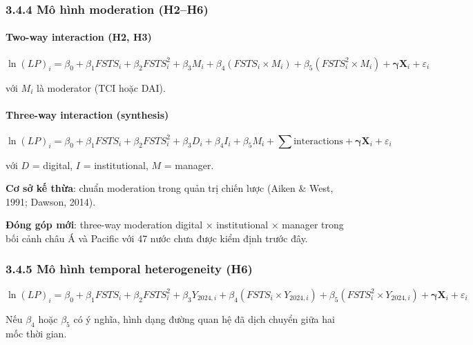 \documentclass[12pt,a4paper]{article}
\begin{document}
\hypertarget{344-muxf4-huxecnh-moderation-h2h6}{%
\subsubsection{3.4.4 Mô hình moderation
(H2--H6)}\label{344-muxf4-huxecnh-moderation-h2h6}}

\hypertarget{two-way-interaction-h2-h3}{%
\paragraph{Two-way interaction (H2,
H3)}\label{two-way-interaction-h2-h3}}

\[\ln(LP)_i = \beta_0 + \beta_1 FSTS_i + \beta_2 FSTS_i^2 + \beta_3 M_i + \beta_4 (FSTS_i \times M_i) + \beta_5 (FSTS_i^2 \times M_i) + \boldsymbol{\gamma} \mathbf{X}_i + \varepsilon_i\]

với \(M_i\) là moderator (TCI hoặc DAI).

\hypertarget{three-way-interaction-synthesis}{%
\paragraph{Three-way interaction
(synthesis)}\label{three-way-interaction-synthesis}}

\[\ln(LP)_i = \beta_0 + \beta_1 FSTS_i + \beta_2 FSTS_i^2 + \beta_3 D_i + \beta_4 I_i + \beta_5 M_i + \sum \text{interactions} + \boldsymbol{\gamma} \mathbf{X}_i + \varepsilon_i\]

với \(D\) = digital, \(I\) = institutional, \(M\) = manager.

\textbf{Cơ sở kế thừa}: chuẩn moderation trong quản trị chiến lược
(Aiken \& West, 1991; Dawson, 2014).

\textbf{Đóng góp mới}: three-way moderation digital × institutional ×
manager trong bối cảnh châu Á và Pacific với 47 nước chưa được kiểm định
trước đây.

\hypertarget{345-muxf4-huxecnh-temporal-heterogeneity-h6}{%
\subsubsection{3.4.5 Mô hình temporal heterogeneity
(H6)}\label{345-muxf4-huxecnh-temporal-heterogeneity-h6}}

\[\ln(LP)_i = \beta_0 + \beta_1 FSTS_i + \beta_2 FSTS_i^2 + \beta_3 Y_{2024,i} + \beta_4 (FSTS_i \times Y_{2024,i}) + \beta_5 (FSTS_i^2 \times Y_{2024,i}) + \boldsymbol{\gamma} \mathbf{X}_i + \varepsilon_i\]

Nếu \(\beta_4\) hoặc \(\beta_5\) có ý nghĩa, hình dạng đường quan hệ đã
dịch chuyển giữa hai mốc thời gian.
\end{document}
